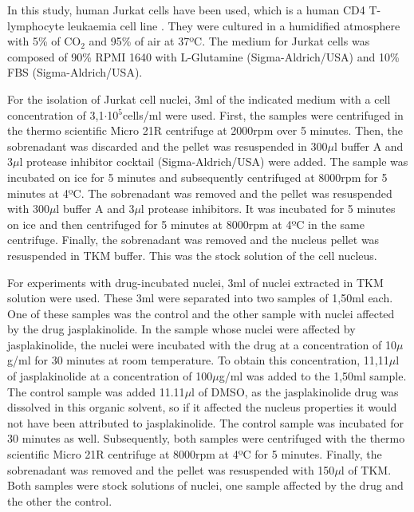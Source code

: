 \documentclass[12pt, a4paper]{article} %
\begin{document}
In this study, human Jurkat cells have been used,  which is a human CD4 T-lymphocyte leukaemia cell line \cite{schneider1977characterization}. They were cultured in a humidified atmosphere with 5\% of CO$_{2}$ and 95\% of air at 37ºC. The medium for Jurkat cells was composed of 90\% RPMI 1640 with L-Glutamine (Sigma-Aldrich/USA) and 10\% FBS (Sigma-Aldrich/USA).

\setlength{\parskip}{4mm}

For the isolation of Jurkat cell nuclei, 3ml of the indicated medium with a cell concentration of 3,1$\cdot$10$^5$cells/ml were used. First, the samples were centrifuged in the thermo scientific Micro 21R centrifuge at 2000rpm over 5 minutes. Then, the sobrenadant was discarded and the pellet was resuspended in 300$\mu$l buffer A and 3$\mu$l protease inhibitor cocktail (Sigma-Aldrich/USA) were added. The sample was incubated on ice for 5 minutes and subsequently centrifuged at 8000rpm for 5 minutes at 4ºC. The sobrenadant was removed and the pellet was resuspended with 300$\mu$l buffer A and 3$\mu$l protease inhibitors. It was incubated for 5 minutes on ice and then centrifuged for 5 minutes at 8000rpm at 4ºC in the same centrifuge. Finally, the sobrenadant was removed and the nucleus pellet was resuspended in TKM buffer. This was the stock solution of the cell nucleus.

\newpage

For experiments with drug-incubated nuclei, 3ml of nuclei extracted in TKM solution were used. These 3ml were separated into two samples of 1,50ml each. One of these samples was the control and the other sample with nuclei affected by the drug jasplakinolide. In the sample whose nuclei were affected by jasplakinolide, the nuclei were incubated with the drug at a concentration of 10$\mu$g/ml for 30 minutes at room temperature. To obtain this concentration, 11,11$\mu$l of jasplakinolide at a concentration of 100$\mu$g/ml was added to the 1,50ml sample. The control sample was added 11.11$\mu$l of DMSO, as the jasplakinolide drug was dissolved in this organic solvent, so if it affected the nucleus properties it would not have been attributed to jasplakinolide. The control sample was incubated for 30 minutes as well. Subsequently, both samples were centrifuged with the thermo scientific Micro 21R centrifuge at 8000rpm at 4ºC for 5 minutes. Finally, the sobrenadant was removed and the pellet was resuspended with 150$\mu$l of TKM. Both samples were stock solutions of nuclei, one sample affected by the drug and the other the control.
\end{document}
